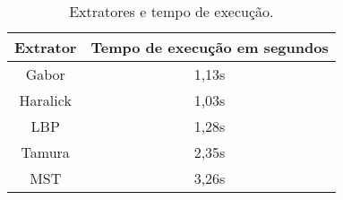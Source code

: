 \begin{table}[H]
    \centering
    \caption[Extratores e tempo de execução]{Extratores e tempo de execução.
    \label{tab:extratorXtempoExecucao}}
    \begin{tabular}{cc}
        \toprule
            Extrator & Tempo de execução em segundos \\
        \midrule
            Gabor & 1,13s \\
            Haralick & 1,03s \\
            LBP & 1,28s \\
            Tamura & 2,35s \\
            MST & 3,26s \\
        \bottomrule
    \end{tabular}
\end{table}

